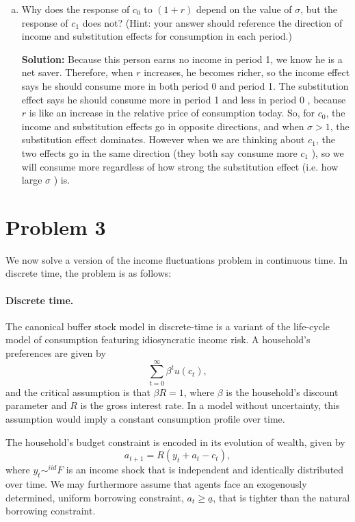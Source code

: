 \documentclass[11pt]{extarticle}
\theoremstyle{plain}
\theoremstyle{definition}
\begin{document}
\begin{enumerate}[(a)]
\item  Why does the response of $c_0$ to $(1+r)$ depend on the value of $\sigma$, but the response of $c_1$ does not? (Hint: your answer should reference the direction of income and substitution effects for consumption in each period.)

\textbf{Solution:} Because this person earns no income in period 1, we know he is a net saver. Therefore, when $r$ increases, he becomes richer, so the income effect says he should consume more in both period 0 and period 1.
The substitution effect says he should consume more in period 1 and less in period 0 , because $r$ is like an increase in the relative price of consumption today.
So, for $c_0$, the income and substitution effects go in opposite directions, and when $\sigma>1$, the substitution effect dominates. However when we are thinking about $c_1$, the two effects go in the same direction (they both say consume more $c_1$ ), so we will consume more regardless of how strong the substitution effect (i.e. how large $\sigma$ ) is.

\end{enumerate}

\vspace{10mm}
\section*{Problem 3}

We now solve a version of the income fluctuations problem in continuous time. In discrete time, the problem is as follows:


\paragraph{Discrete time.} The canonical buffer stock model in discrete-time is a variant of the life-cycle model of consumption featuring idiosyncratic income risk. A household's preferences are given by 
\begin{equation}
	\sum_{t=0}^\infty \beta^t u(c_t),
\end{equation}
and the critical assumption is that $\beta R = 1$, where $\beta$ is the household's discount parameter and $R$ is the gross interest rate. In a model without uncertainty, this assumption would imply a constant consumption profile over time.

The household's budget constraint is encoded in its evolution of wealth, given by 
\begin{equation}
	a_{t+1} = R(y_t + a_t - c_t),
\end{equation}
where $y_t \sim^{iid} F$ is an income shock that is independent and identically distributed over time. We may furthermore assume that agents face an exogenously determined, uniform borrowing constraint, $a_t \geq \underline{a}$, that is tighter than the natural borrowing constraint. 
\end{document}
